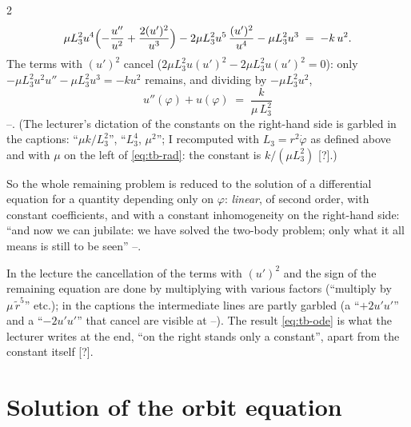 \begin{paracol}{2}
\[
  \mu L_3^2u^4\Bigl(-\frac{u''}{u^2}+\frac{2(u')^2}{u^3}\Bigr)-2\mu L_3^2u^5\,\frac{(u')^2}{u^4}-\mu L_3^2u^3\;=\;-k\,u^2 .
\]
The terms with $(u')^2$ cancel ($2\mu L_3^2u(u')^2-2\mu L_3^2u(u')^2=0$): only $-\mu L_3^2u^2u''-\mu L_3^2u^3=-ku^2$ remains, and dividing by $-\mu L_3^2u^2$,
\begin{equation}\label{eq:tb-ode}
  \boxed{\;u''(\varphi)+u(\varphi)\;=\;\frac{k}{\mu\,L_3^2}\;}
\end{equation}
--. (The lecturer's dictation of the constants on the right-hand side is garbled in the captions: ``$\mu k/L_3^2$'', ``$L_3^4$, $\mu^2$''; I recomputed with $L_3=r^2\dot\varphi$ as defined above and with $\mu$ on the left of \eqref{eq:tb-rad}: the constant is $k/(\mu L_3^2)$ [?].)

So the whole remaining problem is reduced to the solution of a differential equation for a quantity depending only on $\varphi$: \emph{linear}, of second order, with constant coefficients, and with a constant inhomogeneity on the right-hand side: ``and now we can jubilate: we have solved the two-body problem; only what it all means is still to be seen'' --.

\begin{coursenote}\label{cn:tb-sub}
In the lecture the cancellation of the terms with $(u')^2$ and the sign of the remaining equation are done by multiplying with various factors (``multiply by $\mu\,\tilde r^5$'' etc.); in the captions the intermediate lines are partly garbled (a ``$+2u'u'$'' and a ``$-2u'u'$'' that cancel are visible at --). The result \eqref{eq:tb-ode} is what the lecturer writes at the end, ``on the right stands only a constant'', apart from the constant itself [?].
\end{coursenote}

\section{Solution of the orbit equation}\label{sec:tb-solution}


\end{paracol}
